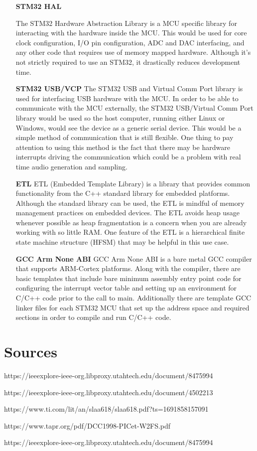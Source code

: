 \documentclass{article}[12pt,a4paper]
\begin{document}
\begin{itemize}
  \item[\textbf{STM32 HAL}]

  The STM32 Hardware Abstraction Library is a MCU specific library for interacting with the hardware inside the MCU. This would be used for core clock configuration, I/O pin configuration, ADC and DAC interfacing, and any other code that requires use of memory mapped hardware. Although it's not strictly required to use an STM32, it drastically reduces development time.

  
  \item[\textbf{STM32 USB/VCP}]
  The STM32 USB and Virtual Comm Port library is used for interfacing USB hardware with the MCU. In order to be able to communicate with the MCU externally, the STM32 USB/Virtual Comm Port library would be used so the host computer, running either Linux or Windows, would see the device as a generic serial device. This would be a simple method of communication that is still flexible. One thing to pay attention to using this method is the fact that there may be hardware interrupts driving the communication which could be a problem with real time audio generation and sampling.

  \item[\textbf{ETL}]
  ETL (Embedded Template Library) is a library that provides common functionality from the C++ standard library for embedded platforms. Although the standard library can be used, the ETL is mindful of memory management practices on embedded devices. The ETL avoids heap usage whenever possible as heap fragmentation is a concern when you are already working with so little RAM. One feature of the ETL is a hierarchical finite state machine structure (HFSM) that may be helpful in this use case.

  \item[\textbf{GCC Arm None ABI}]
  GCC Arm None ABI is a bare metal GCC compiler that supports ARM-Cortex platforms. Along with the compiler, there are basic templates that include bare minimum assembly entry point code for configuring the interrupt vector table and setting up an environment for C/C++ code prior to the call to main. Additionally there are template GCC linker files for each STM32 MCU that set up the address space and required sections in order to compile and run C/C++ code.

\end{itemize}



\section*{Sources}




https://ieeexplore-ieee-org.libproxy.utahtech.edu/document/8475994

https://ieeexplore-ieee-org.libproxy.utahtech.edu/document/4502213

https://www.ti.com/lit/an/slaa618/slaa618.pdf?ts=1691858157091

https://www.tapr.org/pdf/DCC1998-PICet-W2FS.pdf

https://ieeexplore-ieee-org.libproxy.utahtech.edu/document/8475994
\end{document}
